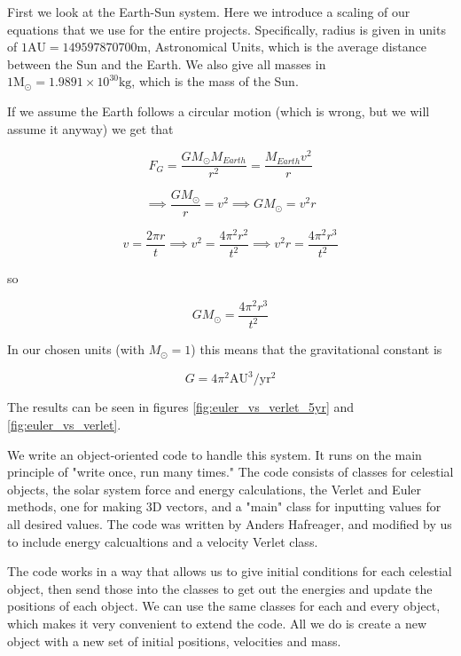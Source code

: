 \documentclass[10pt,showpacs,preprintnumbers,footinbib,amsmath,amssymb,aps,prl,twocolumn,groupedaddress,superscriptaddress,showkeys]{revtex4-1}
\begin{document}
First we look at the Earth-Sun system. Here we introduce a scaling of our equations that we use for the entire projects. Specifically, radius is given in units of $1\mathrm{AU} = 149 597 870 700\mathrm{m}$, Astronomical Units, which is the average distance between the Sun and the Earth. We also give all masses in $1\mathrm{M_\odot} = 1.9891\times10^{30}\mathrm{kg}$, which is the mass of the Sun.

If we assume the Earth follows a circular motion (which is wrong, but we will assume it anyway) we get that


\begin{equation}
F_G = \frac{G M_\odot M_{Earth}}{r^2} = \frac{M_{Earth}v^2}{r}
\end{equation}

$$
\implies \frac{G M_\odot}{r} = v^2 \implies GM_\odot = v^2 r
$$

$$
v = \frac{2\pi r}{t} \implies v^2 = \frac{4\pi^2 r^2}{t^2} \implies v^2 r = \frac{4\pi^2 r^3}{t^2}
$$

so

\begin{equation}
GM_\odot = \frac{4\pi^2 r^3}{t^2}
\end{equation}

In our chosen units (with $M_\odot = 1$) this means that the gravitational constant is

\begin{equation}
G = 4\pi^2 \mathrm{AU^3/yr^2}
\end{equation}

The results can be seen in figures \ref{fig:euler_vs_verlet_5yr} and \ref{fig:euler_vs_verlet}. 

We write an object-oriented code to handle this system. It runs on the main principle of "write once, run many times." The code consists of classes for celestial objects, the solar system force and energy calculations, the Verlet and Euler methods, one for making 3D vectors, and a "main" class for inputting values for all desired values. The code was written by Anders Hafreager, and modified by us to include energy calcualtions and a velocity Verlet class.

The code works in a way that allows us to give initial conditions for each celestial object, then send those into the classes to get out the energies and update the positions of each object. We can use the same classes for each and every object, which makes it very convenient to extend the code. All we do is create a new object with a new set of initial positions, velocities and mass.
\end{document}
